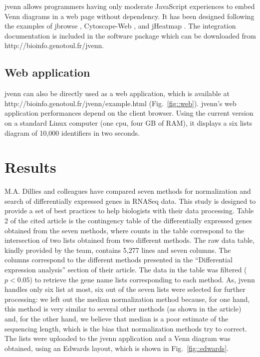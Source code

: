\documentclass{bmcart}
\begin{document}
jvenn allows programmers having only moderate JavaScript experiences to embed 
Venn diagrams in a web page without dependency. It has been designed following
the examples of jbrowse \cite{Westesson01032013}, Cytoscape-Web
\cite{Lopes2010}, and jHeatmap \cite{DeuPons2014}.
The integration documentation is included in the software package which can be
downloaded from http://bioinfo.genotoul.fr/jvenn.

\subsection*{Web application}

jvenn can also be directly used as a web application, which is available at 
http://bioinfo.genotoul.fr/jvenn/example.html (Fig.~\ref{fig::web}).
jvenn's web application performances depend on the client browser. Using the 
current version on a standard Linux computer (one cpu, four GB of RAM), it
displays a six lists diagram of 10,000 identifiers in two seconds.


\section*{Results}

M.A. Dillies and colleagues \cite{Dillies2012} have compared seven methods for
normalization and search of differentially expressed genes in RNASeq data. This
study is designed to provide a set of best practices to help biologists with
their data processing. Table 2 of the cited article is the contingency table
of the differentially expressed genes obtained from the seven methods, where 
counts in the table correspond to the intersection of two lists obtained from
two different methods. The raw data table, kindly provided by the team, contains
5,277 lines and seven columns. The columns correspond to the different methods
presented in the ``Differential expression analysis'' section of their article.
The data in the table was filtered ($p < 0.05$) to retrieve the gene name lists
corresponding to each method. As, jvenn handles only six list at most, six out
of the seven lists were selected for further processing: we left out the median
normalization method because, for one hand, this method is very similar to
several other methods (as shown in the article) and, for the other hand, we
believe that median is a poor estimate of the sequencing length, which is the
bias that normalization methods try to correct. The lists were uploaded to the
jvenn application and a Venn diagram was obtained, using an Edwards layout,
which is shown in Fig.~\ref{fig::edwards}.
\end{document}
